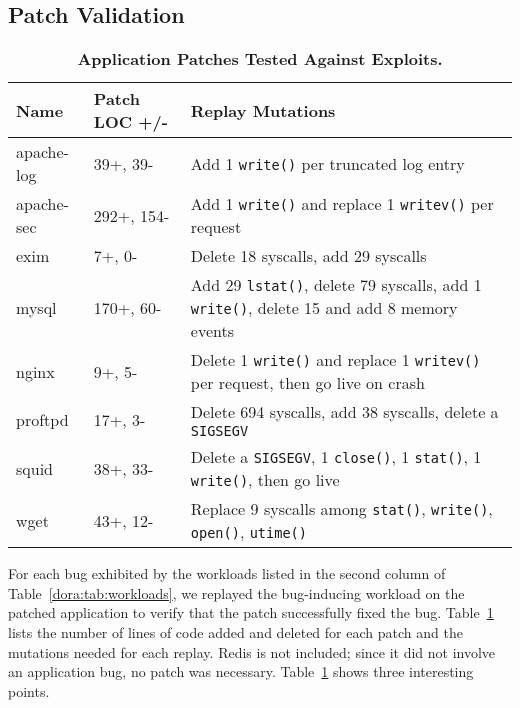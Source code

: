 \subsection{Patch Validation}
\label{dora:sec:validation}

\begin{table}[t]
  \begin{tabular}{llp{10cm}}   \toprule
{\bf Name}     & {\bf Patch LOC +/-} & {\bf Replay Mutations}                                                                           \\ \midrule
		apache-log & 39+, 39-            & Add 1 {\tt write()} per truncated log entry                                                      \\
		apache-sec & 292+, 154-          & Add 1 {\tt write()} and replace 1 {\tt writev()} per request                                     \\
		exim       & 7+, 0-              & Delete 18 syscalls, add 29 syscalls                                                              \\
		mysql      & 170+, 60-           & Add 29 {\tt lstat()}, delete 79 syscalls, add 1 {\tt write()}, delete 15 and add 8 memory events \\
    nginx      & 9+, 5-              & Delete 1 {\tt write()} and replace 1 {\tt writev()} per request, then go live on crash           \\
		proftpd    & 17+, 3-             & Delete 694 syscalls, add 38 syscalls, delete a {\tt SIGSEGV}                                     \\
		squid      & 38+, 33-            & Delete a {\tt SIGSEGV}, 1 {\tt close()}, 1 {\tt stat()}, 1 {\tt write()}, then go live           \\
		wget       & 43+, 12-            & Replace 9 syscalls among {\tt stat()}, {\tt write()}, {\tt open()}, {\tt utime()}                \\
    \bottomrule
\end{tabular}
\caption{{\bf Application Patches Tested Against Exploits.}}
\label{dora:tab:exploits}
\end{table}

For each bug exhibited by the workloads listed in the second column of
Table~\ref{dora:tab:workloads}, we replayed the
bug-inducing workload on the patched application to verify
that the patch successfully fixed the bug. Table~\ref{dora:tab:exploits}
lists the number of lines of code added and deleted for each patch and the
mutations needed for each replay.
Redis is not included; since it did not involve an application bug, no
patch was necessary. Table~\ref{dora:tab:exploits} shows three interesting points.

